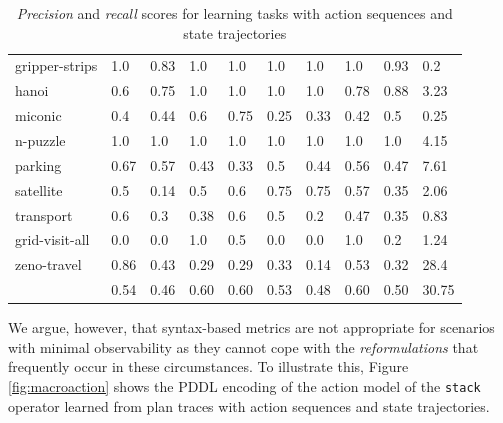 \begin{table}[hbt!]
\begin{center}
\begin{tabular}{l|l|l|l|l|l|l||l|l|l|}
			gripper-strips & 1.0 & 0.83 & 1.0 & 1.0 & 1.0 & 1.0 & 1.0 & 0.93& 0.2 \\ %
			hanoi & 0.6 & 0.75 & 1.0 & 1.0 & 1.0 & 1.0 & 0.78 & 0.88& 3.23 \\ %
			miconic & 0.4 & 0.44 & 0.6 & 0.75 & 0.25 & 0.33 & 0.42 & 0.5& 0.25 \\ %
			n-puzzle & 1.0 & 1.0 & 1.0 & 1.0 & 1.0 & 1.0 & 1.0 & 1.0& 4.15 \\ %
			parking & 0.67 & 0.57 & 0.43 & 0.33 & 0.5 & 0.44 & 0.56 & 0.47& 7.61 \\ %
			satellite & 0.5 & 0.14 & 0.5 & 0.6 & 0.75 & 0.75 & 0.57 & 0.35& 2.06 \\ %
			transport & 0.6 & 0.3 & 0.38 & 0.6 & 0.5 & 0.2 & 0.47 & 0.35& 0.83 \\ %
			grid-visit-all & 0.0 & 0.0 & 1.0 & 0.5 & 0.0 & 0.0 & 1.0 & 0.2& 1.24 \\ %
			zeno-travel & 0.86 & 0.43 & 0.29 & 0.29 & 0.33 & 0.14 & 0.53 & 0.32& 28.4 \\ %
			\hline
			\bf & 0.54 & 0.46 & 0.60 & 0.60 & 0.53 & 0.48 & 0.60 & 0.50 & 30.75
		\end{tabular}
	\end{center}
	\caption{\small {\em Precision} and {\em recall} scores for learning tasks with \NO action sequences and \NO state trajectories}
	\label{tab:results_minimum_0_0}
\end{table}


We argue, however, that syntax-based metrics are not appropriate for scenarios with minimal observability as they cannot cope with the \emph{reformulations} that frequently occur in these circumstances. To illustrate this, Figure \ref{fig:macroaction} shows the PDDL encoding of the action model of the {\tt stack} operator learned from plan traces with \NO action sequences and state trajectories.

